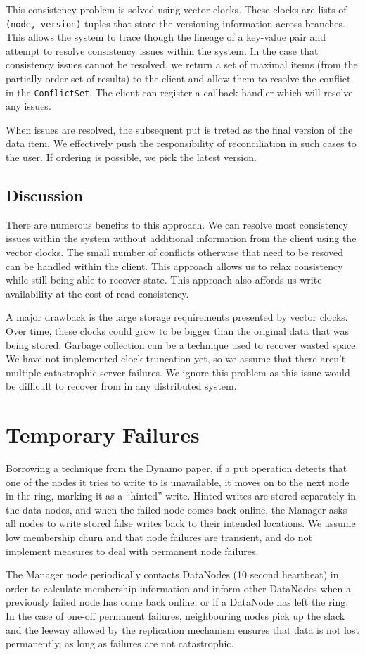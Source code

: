 \documentclass[paper=a4,fontsize=11pt]{report} %
\numberwithin{equation}{section} %
\numberwithin{figure}{section} %
\numberwithin{table}{section} %
\begin{document}
This consistency problem is solved using vector clocks. These clocks are lists of \texttt{(node, version)} tuples that store the versioning information across branches. This allows the system to trace though the lineage of a key-value pair and attempt to resolve consistency issues within the system. In the case that consistency issues cannot be resolved, we return a set of maximal items (from the partially-order set of results) to the client and allow them to resolve the conflict in the \texttt{ConflictSet}. The client can register a callback handler which will resolve any issues.

When issues are resolved, the subsequent put is treted as the final version of the data item. We effectively push the responsibility of reconciliation in such cases to the user. If ordering is possible, we pick the latest version. 

\subsection{Discussion}
There are numerous benefits to this approach. We can resolve most consistency issues within the system without additional information from the client using the vector clocks. The small number of conflicts otherwise that need to be resoved can be handled within the client. This approach allows us to relax consistency while still being able to recover state. This approach also affords us write availability at the cost of read consistency.

A major drawback is the large storage requirements presented by vector clocks. Over time, these clocks could grow to be bigger than the original data that was being stored. Garbage collection can be a technique used to recover wasted space. We have not implemented clock truncation yet, so we assume that there aren't multiple catastrophic server failures. We ignore this problem as this issue would be difficult to recover from in any distributed system.

\section{Temporary Failures}
Borrowing a technique from the Dynamo paper, if a put operation detects that one of the nodes it tries to write to is unavailable, it moves on to the next node in the ring, marking it as a ``hinted'' write. Hinted writes are stored separately in the data nodes, and when the failed node comes back online, the Manager asks all nodes to write stored false writes back to their intended locations. We assume low membership churn and that node failures are transient, and do not implement measures to deal with permanent node failures.

The Manager node periodically contacts DataNodes (10 second heartbeat) in order to calculate membership information and inform other DataNodes when a previously failed node has come back online, or if a DataNode has left the ring. In the case of one-off permanent failures, neighbouring nodes pick up the slack and the leeway allowed by the replication mechanism ensures that data is not lost permanently, as long as failures are not catastrophic. 
\end{document}
